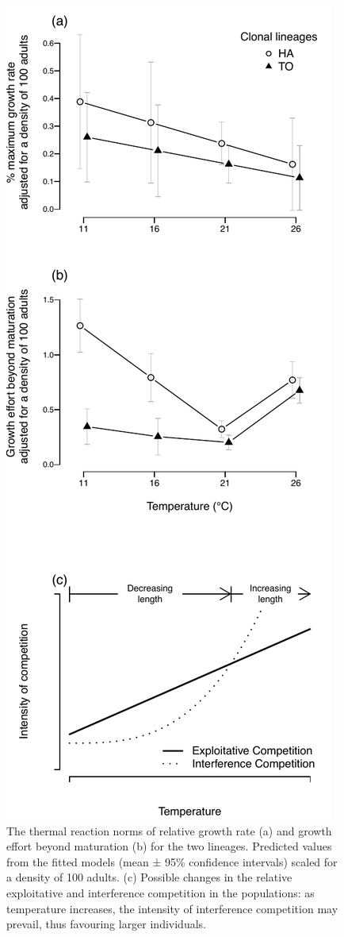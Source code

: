 \begin{figure}[!h] %
\centering
\includegraphics[height=0.8\textheight]{5_ChapExp3/fig/Fig5} 
\caption[Thermal reaction norms of relative
growth rate and GEBM]{ The thermal reaction norms of relative growth rate (a)
and growth effort beyond maturation (b) for the two lineages. Predicted values from the fitted models
(mean ± 95\% confidence intervals) scaled for a density of 100 adults. (c)
Possible changes in the relative exploitative and interference competition in
the populations: as temperature increases, the intensity of interference
competition may prevail, thus favouring larger individuals.}
\label{Fig5-5}
\end{figure}

